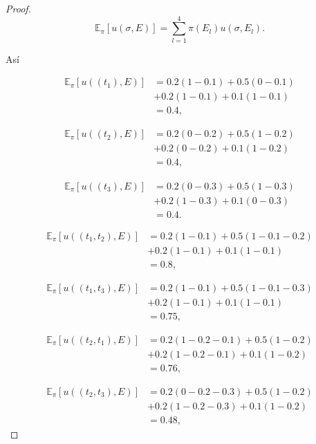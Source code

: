 \documentclass[11pt,letterpaper]{article}
\begin{document}
\begin{proof}
    \[
    \mathbb{E}_\pi[u(\sigma,E)]=\sum_{l=1}^{4}\pi(E_l)u(\sigma,E_l).
    \]

    Así

    \[
    \begin{aligned}
    \mathbb{E}_\pi[u((t_1),E)] &=0.2(1-0.1)+0.5(0-0.1)\\ &+0.2(1-0.1)+0.1(1-0.1)\\ &=0.4,
    \end{aligned}
    \]
    
    \[
    \begin{aligned}
    \mathbb{E}_\pi[u((t_2),E)] &=0.2(0-0.2)+0.5(1-0.2)\\ &+0.2(0-0.2)+0.1(1-0.2)\\ &={0.4},
    \end{aligned}
    \]

    \[
    \begin{aligned}
    \mathbb{E}_\pi[u((t_3),E)] &=0.2(0-0.3)+0.5(1-0.3)\\ &+0.2(1-0.3)+0.1(0-0.3)\\ &={0.4}.
    \end{aligned}
    \]
    
    \[
    \begin{aligned}
    \mathbb{E}_\pi[u((t_1,t_2),E)] &=0.2(1-0.1)+0.5(1-0.1-0.2)\\ &+0.2(1-0.1)+0.1(1-0.1)\\ &={0.8},
    \end{aligned}
    \]
    
    \[
    \begin{aligned}
    \mathbb{E}_\pi[u((t_1,t_3),E)] &=0.2(1-0.1)+0.5(1-0.1-0.3)\\ &+0.2(1-0.1)+0.1(1-0.1)\\ &={0.75},
    \end{aligned}
    \]
    
    \[
    \begin{aligned}
    \mathbb{E}_\pi[u((t_2,t_1),E)]  &=0.2(1-0.2-0.1)+0.5(1-0.2)\\ &+0.2(1-0.2-0.1)+0.1(1-0.2)\\ &={0.76},
    \end{aligned}
    \]
    
    \[
    \begin{aligned}
    \mathbb{E}_\pi[u((t_2,t_3),E)] &=0.2(0-0.2-0.3)+0.5(1-0.2)\\ &+0.2(1-0.2-0.3)+0.1(1-0.2)\\ &={0.48},
    \end{aligned}
    \]
    

\end{proof}
\end{document}
